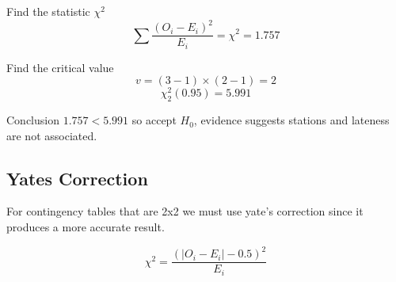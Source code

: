 \begin{example}
        \begin{step}{Find the statistic $\chi^2$}
        $$\sum{\frac{(O_i - E_i)^2}{E_i}} = \chi^2 = 1.757$$
        \end{step}
        
        \begin{step}{Find the critical value}
        $$v = (3-1)\times(2-1) = 2$$
        $$\chi^2_2(0.95) = 5.991$$
        \end{step}
        
        \begin{step}{Conclusion}
        $1.757 < 5.991$ so accept $H_0$, evidence suggests stations and lateness are not associated.
        \end{step}
        
        \end{example}
    
    \subsection{Yates Correction}
        For contingency tables that are 2x2 we must use yate's correction since it produces a more accurate result.
        
        $$
        \chi^2 = \frac{(|O_i - E_i| - 0.5)^2}{E_i}
        $$
    
